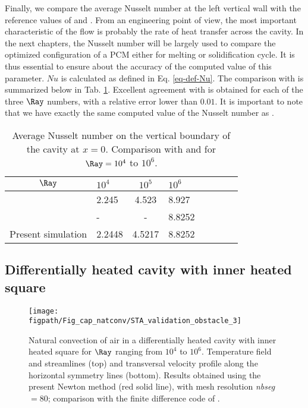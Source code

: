 Finally, we compare the average Nusselt number at the left vertical wall with the reference values of \cite{de1983natural} and \cite{LeQuere91}.
From an engineering point of view, the most important characteristic of the flow is probably the rate of heat  transfer across the cavity.
In the next chapters, the Nusselt number will be largely used to compare the optimized configuration of a PCM either for melting or solidification cycle.
It is thus essential to ensure about the accuracy of the computed value of this parameter.
$N\!u$ is calculated as defined in Eq. \ref{eq-def-Nu}.
The comparison with \cite{de1983natural} is summarized below in Tab. \ref{tab-Nu-natconv}.
Excellent agreement with \cite{de1983natural} is obtained for each of the three $\Ray$ numbers, with a relative error lower than $0.01$.
It is important to note that we have exactly the same computed value of the Nusselt number as \cite{LeQuere91}.
\begin{table}[!ht]
   \begin{center}
      \begin{tabular}{*{4}{cl}}
         
       $\Ray$ & $10^4$ &$ 10^5$ & $10^6 $ \\
         \hline
        \cite{de1983natural} & 2.245 & 4.523  & 8.927 \\
        \cite{LeQuere91} & - & - &  8.8252 \\
        Present simulation & 2.2448 & 4.5217  & 8.8252 \\
      \end{tabular}
   \end{center}
   \caption{Average Nusselt number on the vertical boundary of the cavity at $x=0$. Comparison with \cite{de1983natural} and \cite{LeQuere91} for $\Ray= 10^4$ to $10^6$.}
   \label{tab-Nu-natconv}
\end{table}


\subsection{Differentially heated cavity with inner heated square} \label{sub-2D-OBSTACLE}

\begin{figure}
	\begin{center}
		\texttt{[image: \\figpath/Fig\_cap\_natconv/STA\_validation\_obstacle\_3]} 
	\end{center}
	\caption{Natural convection of air in a differentially heated cavity with inner heated square for $\Ray$ ranging from $10^4$ to $10^6$. Temperature field and streamlines (top) and transversal velocity profile along the  horizontal symmetry lines (bottom). Results obtained using the present Newton method (red solid line), with mesh resolution {\em nbseg} $=80$; comparison with the finite difference code of \cite{Raluca2013}.}
	\label{fig-obst-2D}
\end{figure}

